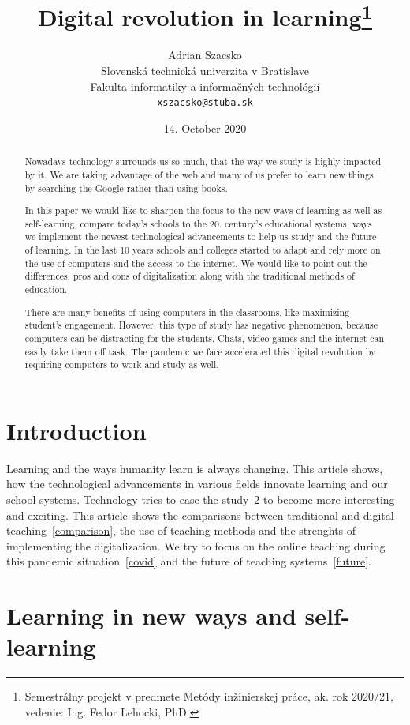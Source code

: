 \documentclass[10pt,oneside,english,a4paper]{article}
\title{Digital revolution in learning\thanks{Semestrálny projekt v predmete Metódy inžinierskej práce, ak. rok 2020/21, vedenie: Ing. Fedor Lehocki, PhD.}} %
\author{Adrian Szacsko\\[2pt]
	{\small Slovenská technická univerzita v Bratislave}\\
	{\small Fakulta informatiky a informačných technológií}\\
	{\small \texttt{xszacsko@stuba.sk}}
	}
\date{\small 14. October 2020} %
\begin{document}
\maketitle

\begin{abstract}
Nowadays technology surrounds us so much, that the way we study is highly impacted
by it. We are taking advantage of the web and many of us prefer to learn new things by
searching the Google rather than using books.

	In this paper we would like to sharpen the focus to the new ways of learning as well as
self-learning, compare today’s schools to the 20. century’s educational systems, ways we
implement the newest technological advancements to help us study and the future of
learning. In the last 10 years schools and colleges started to adapt and rely more on the use
of computers and the access to the internet. We would like to point out the differences, pros
and cons of digitalization along with the traditional methods of education. 

There are many benefits of using computers in the classrooms, like maximizing student’s engagement. However, this type of
study has negative phenomenon, because computers can be distracting for the students.
Chats, video games and the internet can easily take them off task. The pandemic we face
accelerated this digital revolution by requiring computers to work and study as well.
\end{abstract}



\section{Introduction}

	Learning and the ways humanity learn is always changing. This article shows, how the technological advancements in various fields innovate learning and our school systems. Technology tries to ease the study~\ref{self-learning} to become more interesting and exciting. This article shows the comparisons between traditional and digital teaching~\ref{comparison}, the use of teaching methods and the strenghts of implementing the digitalization. We try to focus on the online teaching during this pandemic situation~\ref{covid} and the future of teaching systems~\ref{future}.



\section{Learning in new ways and self-learning}\label{self-learning}
\end{document}
